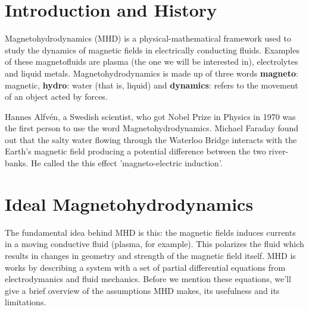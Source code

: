 \documentclass[12pt]{article}
\newenvironment{changemargin}[2]{%
\begin{list}{}{%
\setlength{\topsep}{0pt}%
\setlength{\leftmargin}{#1}%
\setlength{\rightmargin}{#2}%
\setlength{\listparindent}{\parindent}%
\setlength{\itemindent}{\parindent}%
\setlength{\parsep}{\parskip}%
}%
\item[]}{\end{list}}
\begin{document}
\begin{changemargin}{-2cm}{-2cm}
    \section{Introduction and History}
    Magnetohydrodynamics (MHD) is a physical-mathematical framework used to study the dynamics of magnetic fields in electrically conducting fluids. Examples of these magnetofluids are plasma (the one we will be interested in), electrolytes and liquid metals. Magnetohydrodynamics is made up of three words \textbf{magneto}: magnetic, \textbf{hydro}: water (that is, liquid) and \textbf{dynamics}: refers to the movement of an object acted by forces.\cite{sd-mhd}\cite{scholar-mhd}

    Hannes Alfvén, a Swedish scientist, who got Nobel Prize in Physics in 1970 was the first person to use the word Magnetohydrodynamics.\cite{first-mhd}  Michael Faraday found out that the salty water flowing through the Waterloo Bridge interacts with the Earth's magnetic field producing a potential difference between the two river-banks. He called the this effect 'magneto-electric induction'. \cite{wiki-mhd}

    \section{Ideal Magnetohydrodynamics}

    The fundamental idea behind MHD is this: the magnetic fields induces currents in a moving conductive fluid (plasma, for example). This polarizes the fluid which results in changes in geometry and strength of the magnetic field itself. MHD is works by describing a system with a set of partial differential equations from electrodymanics and fluid mechanics. Before we mention these equations, we'll give a brief overview of the assumptions MHD makes, its usefulness and its limitations.


\end{changemargin}
\end{document}
